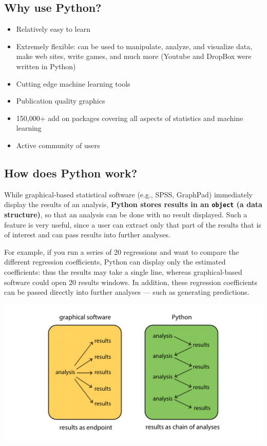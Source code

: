 \documentclass[
]{book}
\providecommand{\tightlist}{%
  \setlength{\itemsep}{0pt}\setlength{\parskip}{0pt}}
\begin{document}
\hypertarget{why-use-python}{%
\subsection{Why use Python?}\label{why-use-python}}

\begin{itemize}
\tightlist
\item
  Relatively easy to learn
\item
  Extremely flexible: can be used to manipulate, analyze, and visualize data,
  make web sites, write games, and much more (Youtube and DropBox were written in Python)
\item
  Cutting edge machine learning tools
\item
  Publication quality graphics
\item
  150,000+ add on packages covering all aspects of statistics and machine learning
\item
  Active community of users
\end{itemize}

\hypertarget{how-does-python-work}{%
\subsection{How does Python work?}\label{how-does-python-work}}

While graphical-based statistical software (e.g., SPSS, GraphPad) immediately display
the results of an analysis, \textbf{Python stores results in an \texttt{object} (a data structure)},
so that an analysis can be done with no result displayed. Such a feature is very
useful, since a user can extract only that part of the results that is of interest
and can pass results into further analyses.

For example, if you run a series of 20 regressions and want to compare the
different regression coefficients, Python can display only the estimated coefficients:
thus the results may take a single line, whereas graphical-based software could
open 20 results windows. In addition, these regression coefficients can be passed
directly into further analyses --- such as generating predictions.

\includegraphics{Python/PythonIntro/images/python_chain.png}
\end{document}
